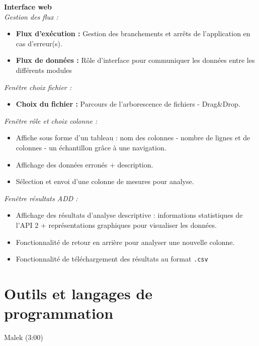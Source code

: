 	\begin{frame}
		\textbf{Interface web}\\
		\textit{Gestion des flux :}
		\begin{itemize}
			\item \textbf{Flux d'exécution :} Gestion des branchements et arrêts de l'application en cas d'erreur(s).
			\item \textbf{Flux de données :} Rôle d'interface pour communiquer les données entre les différents modules
		\end{itemize} \pause
		 \vspace{1cm}
		 
		\textit{Fenêtre choix fichier :}
		\begin{itemize}
			\item \textbf{Choix du fichier :} Parcours de l'arborescence de fichiers - Drag\&Drop.
		\end{itemize}
	\end{frame}
	
	\begin{frame}
		\textit{Fenêtre rôle et choix colonne :}
		\begin{itemize}
		\item Affiche sous forme d'un tableau : nom des colonnes - nombre de lignes et de colonnes - un échantillon grâce à une navigation.
		\item Affichage des données erronés + description.
		\item Sélection et envoi d'une colonne de mesures pour analyse. 
		\end{itemize} \pause
		 \vspace{1cm}
		 
		\textit{Fenêtre résultats ADD :}
		\begin{itemize}
		\item Affichage des résultats d'analyse descriptive : informations statistiques de l'API 2 + représentations graphiques pour visualiser les données.
		\item Fonctionnalité de retour en arrière pour analyser une nouvelle colonne.
		\item Fonctionnalité de téléchargement des résultats au format \lstinline!.csv!
		\end{itemize}
	\end{frame}
	
	\section{Outils et langages de programmation}
		\begin{frame}
			Malek (3:00)
		\end{frame}
	
